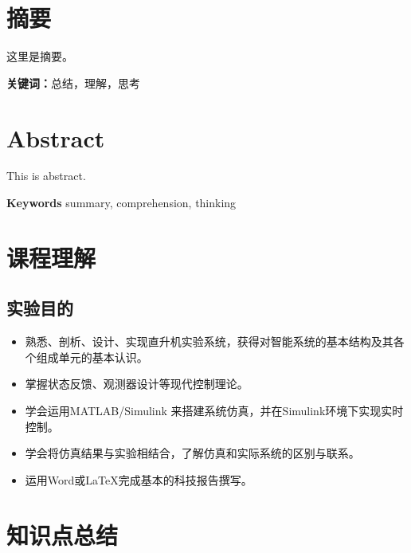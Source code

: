 \documentclass[a4paper,12pt]{report}
\begin{document}
\chapter*{摘要}
    
这里是摘要。

\textbf{关键词：}总结，理解，思考

\chapter*{Abstract}

This is abstract.

\textbf{Keywords } summary, comprehension, thinking

\tableofcontents %

\chapter{课程理解}
\setcounter{page}{1}

\section{实验目的}

\begin{itemize}
    \item 熟悉、剖析、设计、实现直升机实验系统，获得对智能系统的基本结构及其各个组成单元的基本认识。
    \item 掌握状态反馈、观测器设计等现代控制理论。
    \item 学会运用MATLAB/Simulink 来搭建系统仿真，并在Simulink环境下实现实时控制。
    \item 学会将仿真结果与实验相结合，了解仿真和实际系统的区别与联系。
    \item 运用Word或\LaTeX 完成基本的科技报告撰写。
\end{itemize}

\chapter{知识点总结} 
\end{document}
